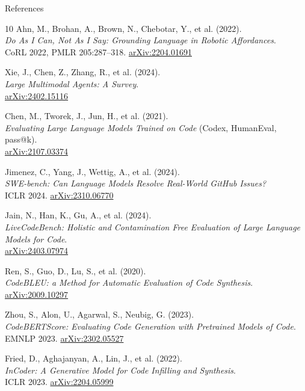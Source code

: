 \begin{frame}[allowframebreaks]{References}
\begin{thebibliography}{10}
      Ahn, M., Brohan, A., Brown, N., Chebotar, Y., et al. (2022). \\
      \emph{Do As I Can, Not As I Say: Grounding Language in Robotic Affordances}.\\
      CoRL 2022, PMLR 205:287--318. \href{https://arxiv.org/abs/2204.01691}{arXiv:2204.01691}

      Xie, J., Chen, Z., Zhang, R., et al. (2024). \\
      \emph{Large Multimodal Agents: A Survey}.\\
      \href{https://arxiv.org/abs/2402.15116}{arXiv:2402.15116}

      Chen, M., Tworek, J., Jun, H., et al. (2021). \\
      \emph{Evaluating Large Language Models Trained on Code} (Codex, HumanEval, pass@k).\\
      \href{https://arxiv.org/abs/2107.03374}{arXiv:2107.03374}

      Jimenez, C., Yang, J., Wettig, A., et al. (2024). \\
      \emph{SWE-bench: Can Language Models Resolve Real-World GitHub Issues?}\\
      ICLR 2024. \href{https://arxiv.org/abs/2310.06770}{arXiv:2310.06770}

      Jain, N., Han, K., Gu, A., et al. (2024). \\
      \emph{LiveCodeBench: Holistic and Contamination Free Evaluation of Large Language Models for Code}.\\
      \href{https://arxiv.org/abs/2403.07974}{arXiv:2403.07974}

      Ren, S., Guo, D., Lu, S., et al. (2020). \\
      \emph{CodeBLEU: a Method for Automatic Evaluation of Code Synthesis}.\\
      \href{https://arxiv.org/abs/2009.10297}{arXiv:2009.10297}

      Zhou, S., Alon, U., Agarwal, S., Neubig, G. (2023). \\
      \emph{CodeBERTScore: Evaluating Code Generation with Pretrained Models of Code}.\\
      EMNLP 2023. \href{https://arxiv.org/abs/2302.05527}{arXiv:2302.05527}

      Fried, D., Aghajanyan, A., Lin, J., et al. (2022). \\
      \emph{InCoder: A Generative Model for Code Infilling and Synthesis}.\\
      ICLR 2023. \href{https://arxiv.org/abs/2204.05999}{arXiv:2204.05999}


\end{thebibliography}
\end{frame}
